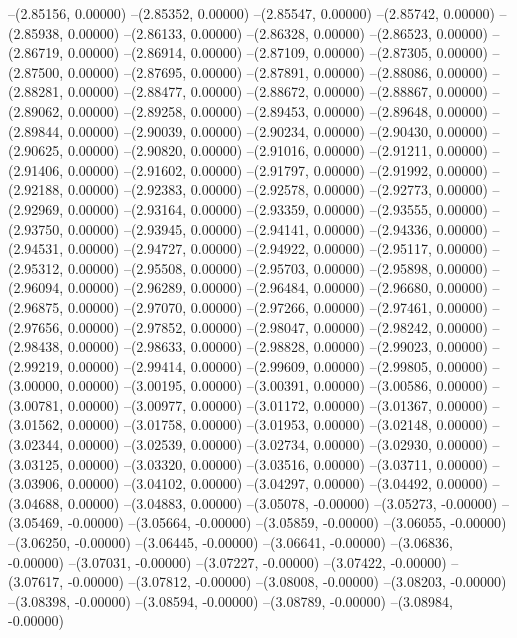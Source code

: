 --(2.85156, 0.00000)
--(2.85352, 0.00000)
--(2.85547, 0.00000)
--(2.85742, 0.00000)
--(2.85938, 0.00000)
--(2.86133, 0.00000)
--(2.86328, 0.00000)
--(2.86523, 0.00000)
--(2.86719, 0.00000)
--(2.86914, 0.00000)
--(2.87109, 0.00000)
--(2.87305, 0.00000)
--(2.87500, 0.00000)
--(2.87695, 0.00000)
--(2.87891, 0.00000)
--(2.88086, 0.00000)
--(2.88281, 0.00000)
--(2.88477, 0.00000)
--(2.88672, 0.00000)
--(2.88867, 0.00000)
--(2.89062, 0.00000)
--(2.89258, 0.00000)
--(2.89453, 0.00000)
--(2.89648, 0.00000)
--(2.89844, 0.00000)
--(2.90039, 0.00000)
--(2.90234, 0.00000)
--(2.90430, 0.00000)
--(2.90625, 0.00000)
--(2.90820, 0.00000)
--(2.91016, 0.00000)
--(2.91211, 0.00000)
--(2.91406, 0.00000)
--(2.91602, 0.00000)
--(2.91797, 0.00000)
--(2.91992, 0.00000)
--(2.92188, 0.00000)
--(2.92383, 0.00000)
--(2.92578, 0.00000)
--(2.92773, 0.00000)
--(2.92969, 0.00000)
--(2.93164, 0.00000)
--(2.93359, 0.00000)
--(2.93555, 0.00000)
--(2.93750, 0.00000)
--(2.93945, 0.00000)
--(2.94141, 0.00000)
--(2.94336, 0.00000)
--(2.94531, 0.00000)
--(2.94727, 0.00000)
--(2.94922, 0.00000)
--(2.95117, 0.00000)
--(2.95312, 0.00000)
--(2.95508, 0.00000)
--(2.95703, 0.00000)
--(2.95898, 0.00000)
--(2.96094, 0.00000)
--(2.96289, 0.00000)
--(2.96484, 0.00000)
--(2.96680, 0.00000)
--(2.96875, 0.00000)
--(2.97070, 0.00000)
--(2.97266, 0.00000)
--(2.97461, 0.00000)
--(2.97656, 0.00000)
--(2.97852, 0.00000)
--(2.98047, 0.00000)
--(2.98242, 0.00000)
--(2.98438, 0.00000)
--(2.98633, 0.00000)
--(2.98828, 0.00000)
--(2.99023, 0.00000)
--(2.99219, 0.00000)
--(2.99414, 0.00000)
--(2.99609, 0.00000)
--(2.99805, 0.00000)
--(3.00000, 0.00000)
--(3.00195, 0.00000)
--(3.00391, 0.00000)
--(3.00586, 0.00000)
--(3.00781, 0.00000)
--(3.00977, 0.00000)
--(3.01172, 0.00000)
--(3.01367, 0.00000)
--(3.01562, 0.00000)
--(3.01758, 0.00000)
--(3.01953, 0.00000)
--(3.02148, 0.00000)
--(3.02344, 0.00000)
--(3.02539, 0.00000)
--(3.02734, 0.00000)
--(3.02930, 0.00000)
--(3.03125, 0.00000)
--(3.03320, 0.00000)
--(3.03516, 0.00000)
--(3.03711, 0.00000)
--(3.03906, 0.00000)
--(3.04102, 0.00000)
--(3.04297, 0.00000)
--(3.04492, 0.00000)
--(3.04688, 0.00000)
--(3.04883, 0.00000)
--(3.05078, -0.00000)
--(3.05273, -0.00000)
--(3.05469, -0.00000)
--(3.05664, -0.00000)
--(3.05859, -0.00000)
--(3.06055, -0.00000)
--(3.06250, -0.00000)
--(3.06445, -0.00000)
--(3.06641, -0.00000)
--(3.06836, -0.00000)
--(3.07031, -0.00000)
--(3.07227, -0.00000)
--(3.07422, -0.00000)
--(3.07617, -0.00000)
--(3.07812, -0.00000)
--(3.08008, -0.00000)
--(3.08203, -0.00000)
--(3.08398, -0.00000)
--(3.08594, -0.00000)
--(3.08789, -0.00000)
--(3.08984, -0.00000)

